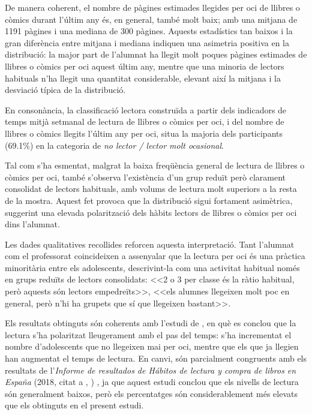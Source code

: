 \documentclass[12pt]{article}
\newcommand{\nestedtextcite}[2]{%
  (#1, citat a \citeauthor{#2}, \citeyear{#2})%
}
\begin{document}
De manera coherent, el nombre de pàgines estimades llegides per oci de llibres o còmics durant l'últim any és, en general, també molt baix; amb una mitjana de 1191 pàgines i una mediana de 300 pàgines. Aquests estadístics tan baixos i la gran diferència entre mitjana i mediana indiquen una asimetria positiva en la distribució: la major part de l'alumnat ha llegit molt poques pàgines estimades de llibres o còmics per oci aquest últim any, mentre que una minoria de lectors habituals n'ha llegit una quantitat considerable, elevant així la mitjana i la desviació típica de la distribució.

En consonància, la classificació lectora construïda a partir dels indicadors de temps mitjà setmanal de lectura de llibres o còmics per oci, i del nombre de llibres o còmics llegits l'últim any per oci, situa la majoria dels participants (69.1\%) en la categoria de \emph{no lector / lector molt ocasional}.

Tal com s'ha esmentat, malgrat la baixa freqüència general de lectura de llibres o còmics per oci, també s’observa l’existència d’un grup reduït però clarament consolidat de lectors habituals, amb volums de lectura molt superiors a la resta de la mostra. Aquest fet provoca que la distribució sigui fortament asimètrica, suggerint una elevada polarització dels hàbits lectors de llibres o còmics per oci dins l’alumnat.

Les dades qualitatives recollides reforcen aquesta interpretació. Tant l'alumnat com el professorat coincideixen a assenyalar que la lectura per oci és una pràctica minoritària entre els adolescents, descrivint-la com una activitat habitual només en grups reduïts de lectors consolidats: <<2 o 3 per classe és la ràtio habitual, però aquests són lectors empedreïts>>, <<els alumnes llegeixen molt poc en general, però n'hi ha grupets que sí que llegeixen bastant>>. 

Els resultats obtinguts són coherents amb l'estudi de \textcite{johnsson_bookreading}, en què es conclou que la lectura s'ha polaritzat lleugerament amb el pas del temps: s'ha incrementat el nombre d'adolescents que no llegeixen mai per oci, mentre que els que ja llegien han augmentat el temps de lectura. En canvi, són parcialment congruents amb els resultats de l'\emph{Informe de resultados de Hábitos de lectura y compra de libros en España} \nestedtextcite{2018}{sanches}, ja que aquest estudi conclou que els nivells de lectura són generalment baixos, però els percentatges són considerablement més elevats que els obtinguts en el present estudi.
\end{document}
